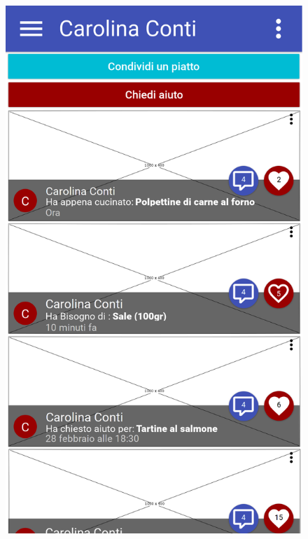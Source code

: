 \begin{figure}[H]
\begin{minipage}{.49\textwidth}
		\includegraphics[width=\textwidth]{img/wireframe/profilo_social.png}
	\end{minipage}
\end{figure}
